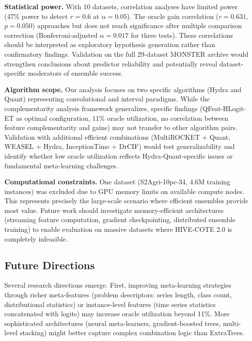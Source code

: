 \documentclass[pdflatex,sn-basic]{sn-jnl}           %
\theoremstyle{thmstyleone}%
\theoremstyle{thmstyletwo}%
\theoremstyle{thmstylethree}%
\begin{document}
\textbf{Statistical power.} With 10 datasets, correlation analyses have limited power (47\% power to detect $r=0.6$ at $\alpha=0.05$). The oracle gain correlation ($r=0.631$, $p=0.050$) approaches but does not reach significance after multiple comparison correction (Bonferroni-adjusted $\alpha=0.017$ for three tests). These correlations should be interpreted as exploratory hypothesis generation rather than confirmatory findings. Validation on the full 29-dataset MONSTER archive would strengthen conclusions about predictor reliability and potentially reveal dataset-specific moderators of ensemble success.

\textbf{Algorithm scope.} Our analysis focuses on two specific algorithms (Hydra and Quant) representing convolutional and interval paradigms. While the complementarity analysis framework generalizes, specific findings (QFeat-HLogit-ET as optimal configuration, 11\% oracle utilization, no correlation between feature complementarity and gains) may not transfer to other algorithm pairs. Validation with additional efficient combinations (MultiROCKET + Quant, WEASEL + Hydra, InceptionTime + DrCIF) would test generalizability and identify whether low oracle utilization reflects Hydra-Quant-specific issues or fundamental meta-learning challenges.

\textbf{Computational constraints.} One dataset (S2Agri-10pc-34, 4.6M training instances) was excluded due to GPU memory limits on available compute nodes. This represents precisely the large-scale scenario where efficient ensembles provide most value. Future work should investigate memory-efficient architectures (streaming feature computation, gradient checkpointing, distributed ensemble training) to enable evaluation on massive datasets where HIVE-COTE 2.0 is completely infeasible.

\subsection{Future Directions}

Several research directions emerge. First, improving meta-learning strategies through richer meta-features (problem descriptors: series length, class count, distributional statistics) or instance-level features (time series statistics concatenated with logits) may increase oracle utilization beyond 11\%. More sophisticated architectures (neural meta-learners, gradient-boosted trees, multi-level stacking) might better capture complex combination logic than ExtraTrees.
\end{document}

